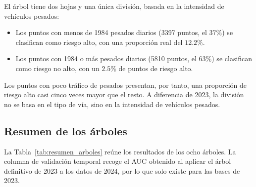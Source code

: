 \documentclass[twoside,a4paper,12pt,onecolumn,openany]{book}
\begin{document}
El árbol tiene dos hojas y una única división, basada en la intensidad de vehículos pesados:
 
\begin{itemize}
    \item Los puntos con menos de 1984 pesados diarios (3397 puntos, el $37\%$) se clasifican como riesgo alto, con una proporción real del $12.2\%$.
    \item Los puntos con 1984 o más pesados diarios (5810 puntos, el $63\%$) se clasifican como riesgo no alto, con un $2.5\%$ de puntos de riesgo alto.
\end{itemize}
 
Los puntos con poco tráfico de pesados presentan, por tanto, una proporción de riesgo alto casi cinco veces mayor que el resto. A diferencia de 2023, la división no se basa en el tipo de vía, sino en la intensidad de vehículos pesados.
 
\subsection{Resumen de los árboles}
 
La Tabla~\ref{tab:resumen_arboles} reúne los resultados de los ocho árboles. La columna de validación temporal recoge el AUC obtenido al aplicar el árbol definitivo de 2023 a los datos de 2024, por lo que solo existe para las bases de 2023.
 
\end{document}
